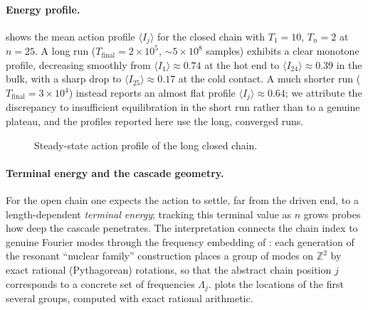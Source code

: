\documentclass[11pt,a4paper]{article}
\theoremstyle{definition}
\numberwithin{equation}{section}   %
\begin{document}
\paragraph{Energy profile.}
 shows the mean action profile $\langle I_j\rangle$ for the
closed chain with $T_1=10$, $T_n=2$ at $n=25$. A long run
($T_{\mathrm{final}}=2\times10^{5}$, $\sim5\times10^{8}$ samples) exhibits a
clear monotone profile, decreasing smoothly from $\langle I_1\rangle\approx0.74$
at the hot end to $\langle I_{24}\rangle\approx0.39$ in the bulk, with a sharp
drop to $\langle I_{25}\rangle\approx0.17$ at the cold contact. A much shorter
run ($T_{\mathrm{final}}=3\times10^{4}$) instead reports an almost flat profile
$\langle I_j\rangle\approx0.64$; we attribute the discrepancy to insufficient
equilibration in the short run rather than to a genuine plateau, and the
profiles reported here use the long, converged runs.

\begin{figure}[ht]
  \centering
  \caption{Steady-state action profile of the long closed chain.}
  \label{fig:profile}
\end{figure}

\paragraph{Terminal energy and the cascade geometry.}
For the open chain one expects the action to settle, far from the driven end, to
a length-dependent \emph{terminal energy}; tracking this terminal value as $n$
grows probes how deep the cascade penetrates. The interpretation connects the
chain index to genuine Fourier modes through the frequency embedding of
\cite{CKSTT}: each generation of the resonant ``nuclear family'' construction
places a group of modes on $\mathbb{Z}^2$ by exact rational (Pythagorean)
rotations, so that the abstract chain position $j$ corresponds to a concrete set
of frequencies $\Lambda_j$.  plots the locations of the
first several groups, computed with exact rational arithmetic.
\end{document}
